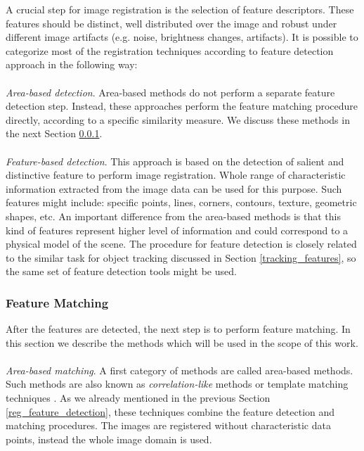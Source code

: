 A crucial step for image registration is the selection of feature descriptors.
These features should be distinct, well distributed over the image and robust under different image artifacts (e.g. noise, brightness changes, artifacts).
It is possible to categorize most of the registration techniques according to feature detection approach in the following way: 
\\
\\
\textit{Area-based detection}. Area-based methods do not perform a separate feature detection step. Instead, these approaches perform the feature matching procedure directly, according to a specific similarity measure. We discuss these methods in the next Section \ref{reg_feature_matching}.
\\
\\
\textit{Feature-based detection}. This approach is based on the detection of salient and distinctive feature to perform image registration.  Whole range of characteristic information extracted from the image data can be used for this purpose. Such features might include: specific points, lines, corners, contours, texture, geometric shapes, etc. An important difference from the area-based methods is that this kind of features represent higher level of information and could correspond to a physical model of the scene. 
The procedure for feature detection is closely related to the similar task for object tracking discussed in Section \ref{tracking_features}, so the same set of feature detection tools might be used.






\subsubsection{Feature Matching}
\label{reg_feature_matching}

After the features are detected, the next step is to perform feature matching.
In this section we describe the methods which will be used in the scope of this work.
\\
\\
\textit{Area-based matching}. A first category of methods are called area-based methods.
Such methods are also known as \textit{correlation-like}
methods or template matching techniques \cite{Zitova03}. As we already mentioned in the previous Section \ref{reg_feature_detection}, these techniques combine the feature detection and matching procedures. The images are registered without characteristic data points, instead the whole image domain is used.


